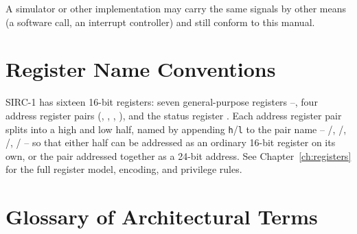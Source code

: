 A simulator or other implementation may carry the same signals by other means (a software call, an interrupt
controller) and still conform to this manual.

\section*{Register Name Conventions}

SIRC-1 has sixteen 16-bit registers: seven general-purpose registers --, four address register pairs
(, , , ), and the status register . Each address register pair splits into a high
and low half, named by appending \texttt{h}/\texttt{l} to the pair name -- /, /,
/, / -- so that either half can be addressed as an ordinary 16-bit register on its own,
or the pair addressed together as a 24-bit address. See Chapter~\ref{ch:registers} for the full register model,
encoding, and privilege rules.

\section*{Glossary of Architectural Terms}

